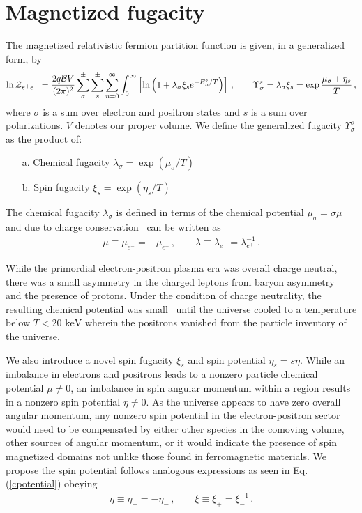 \documentclass[a4paper]{article}
\newcommand*{\keV}{\text{ keV}}
\newcommand{\req}[1]{Eq.\,(\ref{#1})}
\begin{document}
\section{Magnetized fugacity}
\label{sec:fugacity}
\noindent The magnetized relativistic fermion partition function is given, in a generalized form, by
\begin{align}
    \label{partition}
    \ln{\cal Z}_{e^{+}e^{-}}=\frac{2q{\cal B}V}{(2\pi)^{2}}\sum_{\sigma}^{\pm}\sum_{s}^{\pm}\sum_{n=0}^{\infty}\int_{0}^{\infty}\left[\ln\left(1+\lambda_{\sigma}\xi_{s}e^{-E_{n}^{s}/T}\right)\right]\,,\qquad\Upsilon_{\sigma}^{s}=\lambda_{\sigma}\xi_{s}=\exp{\frac{\mu_{\sigma}+\eta_{s}}{T}}\,,
\end{align}
where $\sigma$ is a sum over electron and positron states and $s$ is a sum over polarizations. $V$ denotes our proper volume. We define the generalized fugacity $\Upsilon_{\sigma}^{s}$ as the product of:
\begin{itemize}
    \item[a.] Chemical fugacity $\lambda_{\sigma}=\exp{(\mu_{\sigma}/T)}$
    \item[b.] Spin fugacity $\xi_{s}=\exp{(\eta_{s}/T)}$
\end{itemize}
The chemical fugacity $\lambda_{\sigma}$ is defined in terms of the chemical potential $\mu_{\sigma}=\sigma\mu$ and due to charge conservation~\cite{elze1980relativistic} can be written as 
\begin{align}
    \label{cpotential}
    \mu\equiv\mu_{e^{-}}=-\mu_{e^{+}}\,,\qquad
    \lambda\equiv\lambda_{e^{-}}=\lambda_{e^{+}}^{-1}\,.
\end{align}

While the primordial electron-positron plasma era was overall charge neutral, there was a small asymmetry in the charged leptons from baryon asymmetry~\cite{canetti2012matter} and the presence of protons. Under the condition of charge neutrality, the resulting chemical potential was small~\cite{rafelski2023short} until the universe cooled to a temperature below $T<20\keV$ wherein the positrons vanished from the particle inventory of the universe.

We also introduce a novel spin fugacity $\xi_{s}$ and spin potential $\eta_{s}=s\eta$. While an imbalance in electrons and positrons leads to a nonzero particle chemical potential $\mu\neq0$, an imbalance in spin angular momentum within a region results in a nonzero spin potential $\eta\neq0$. As the universe appears to have zero overall angular momentum, any nonzero spin potential in the electron-positron sector would need to be compensated by either other species in the comoving volume, other sources of angular momentum, or it would indicate the presence of spin magnetized domains not unlike those found in ferromagnetic materials. We propose the spin potential follows analogous expressions as seen in \req{cpotential} obeying
\begin{align}
    \label{spotential}
    \eta\equiv\eta_{+}=-\eta_{-}\,,\qquad
    \xi\equiv\xi_{+}=\xi_{-}^{-1}\,.
\end{align}
\end{document}
